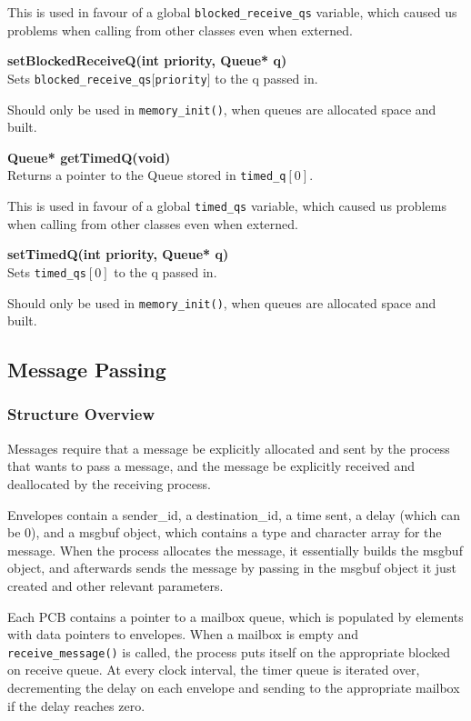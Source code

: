 \documentclass[11pt, oneside]{article}
\begin{document}
This is used in favour of a global {\tt blocked\_receive\_qs} variable, which caused us problems when calling from other classes even when externed.

{\bf setBlockedReceiveQ(int priority, Queue* q)}\\
Sets {\tt blocked\_receive\_qs$[$priority$]$} to the q passed in.

Should only be used in {\tt memory\_init()}, when queues are allocated space and built.

{\bf Queue* getTimedQ(void)}\\
Returns a pointer to the Queue stored in {\tt timed\_q$[0]$}.

This is used in favour of a global {\tt timed\_qs} variable, which caused us problems when calling from other classes even when externed.

{\bf setTimedQ(int priority, Queue* q)}\\
Sets {\tt timed\_qs$[0]$} to the q passed in.

Should only be used in {\tt memory\_init()}, when queues are allocated space and built.

\subsection{Message Passing}
\subsubsection{Structure Overview}
Messages require that a message be explicitly allocated and sent by the process that wants to pass a message, and the message be explicitly received and deallocated by the receiving process.

Envelopes contain a sender\_id, a destination\_id, a time sent, a delay (which can be 0), and a msgbuf object, which contains a type and character array for the message. When the process allocates the message, it essentially builds the msgbuf object, and afterwards sends the message by passing in the msgbuf object it just created and other relevant parameters.

Each PCB contains a pointer to a mailbox queue, which is populated by elements with data pointers to envelopes. When a mailbox is empty and {\tt receive\_message()} is called, the process puts itself on the appropriate blocked on receive queue. At every clock interval, the timer queue is iterated over, decrementing the delay on each envelope and sending to the appropriate mailbox if the delay reaches zero.
\end{document}
